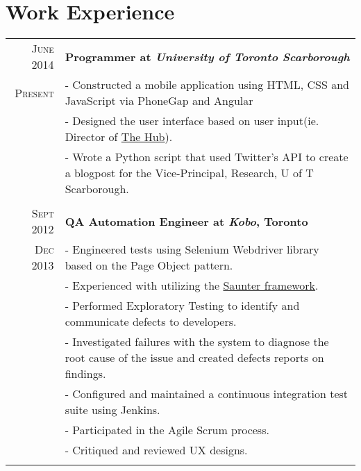 \documentclass[a4paper, 10pt]{article}
\begin{document}
\section{\bf{Work Experience}}
\begin{tabular}{r|p{16cm}}
    \textsc{June 2014} & \bf{Programmer at \emph{University of Toronto Scarborough}}\\
    \textsc{Present}&{- Constructed a mobile application using HTML, CSS and JavaScript via PhoneGap and Angular}\\
    &{- Designed the user interface based on user input(ie. Director of \href{http://blog.utsc.utoronto.ca/thehub/}{The Hub}).}\\
    &{- Wrote a Python script that used Twitter's API to create a blogpost for the Vice-Principal, Research, U of T Scarborough.} \\
    \multicolumn{2}{c}{} \\
    \textsc{Sept 2012} & \bf{QA Automation Engineer at \emph{Kobo}, Toronto}\\
    \textsc{Dec 2013}& {- Engineered tests using Selenium Webdriver library based on the Page Object pattern.}\\
    &{- Experienced with utilizing the \href{https://github.com/Element-34/py.saunter}{Saunter framework}.} \\
    &{- Performed Exploratory Testing to identify and communicate defects to developers.} \\
    &{- Investigated failures with the system to diagnose the root cause of the issue and created defects reports on findings.} \\
    &{- Configured and maintained a continuous integration test suite using Jenkins.} \\
    &{- Participated in the Agile Scrum process.} \\
    &{- Critiqued and reviewed UX designs.} \\
    \multicolumn{2}{c}{}
\end{tabular}\\\\
\end{document}
